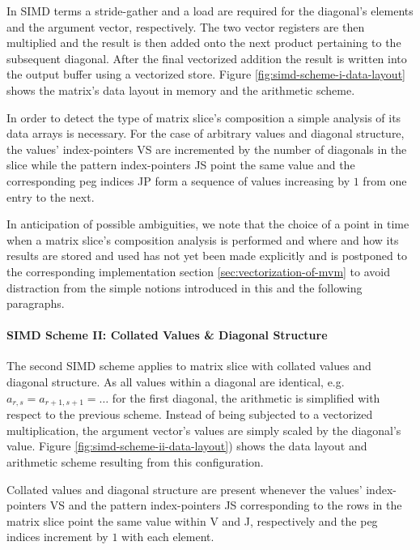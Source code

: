           In SIMD terms a stride-gather and a load are required for the diagonal's elements and the argument vector,
          respectively. The two vector registers are then multiplied and the result is then added onto the next product
          pertaining to the subsequent diagonal. After the final vectorized addition the result is written into the
          output buffer using a vectorized store. Figure \ref{fig:simd-scheme-i-data-layout} shows the matrix's data
          layout in memory and the arithmetic scheme.

          In order to detect the type of matrix slice's composition a simple analysis of its data arrays is necessary.
          For the case of arbitrary values and diagonal structure, the values' index-pointers VS are incremented by the
          number of diagonals in the slice while the pattern index-pointers JS point the same value and the
          corresponding peg indices JP form a sequence of values increasing by $1$ from one entry to the next.

          In anticipation of possible ambiguities, we note that the choice of a point in time when a matrix slice's
          composition analysis is performed and where and how its results are stored and used has not yet been made
          explicitly and is postponed to the corresponding implementation section \ref{sec:vectorization-of-mvm} to
          avoid distraction from the simple notions introduced in this and the following paragraphs.

        \paragraph{SIMD Scheme II: Collated Values \& Diagonal Structure}

          The second SIMD scheme applies to matrix slice with collated values and diagonal structure. As all values
          within a diagonal are identical, e.g. $a_{r,s} = a_{r+1, s+1} = \ldots$ for the first diagonal, the arithmetic
          is simplified with respect to the previous scheme. Instead of being subjected to a vectorized multiplication,
          the argument vector's values are simply scaled by the diagonal's value. Figure \ref{fig:simd-scheme-ii-data-layout})
          shows the data layout and arithmetic scheme resulting from this configuration.

          Collated values and diagonal structure are present whenever the values' index-pointers VS and the pattern
          index-pointers JS corresponding to the rows in the matrix slice point the same value within V and J,
          respectively and the peg indices increment by $1$ with each element.

